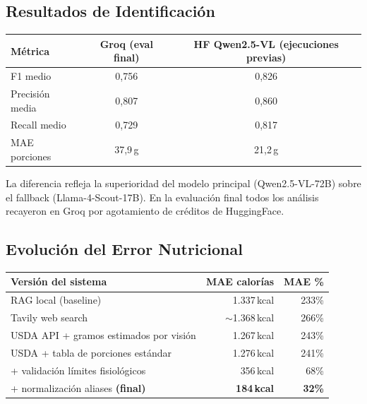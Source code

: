 \documentclass[10pt,a4paper]{article}
\begin{document}
\subsection{Resultados de Identificación}

\begin{center}
\begin{tabular}{lcc}
\toprule
\textbf{Métrica} & \textbf{Groq (eval final)} & \textbf{HF Qwen2.5-VL (ejecuciones previas)} \\
\midrule
F1 medio        & 0,756 & 0,826 \\
Precisión media & 0,807 & 0,860 \\
Recall medio    & 0,729 & 0,817 \\
MAE porciones   & 37,9\,g & 21,2\,g \\
\bottomrule
\end{tabular}
\end{center}

La diferencia refleja la superioridad del modelo principal (Qwen2.5-VL-72B) sobre el fallback
(Llama-4-Scout-17B). En la evaluación final todos los análisis recayeron en Groq por agotamiento
de créditos de HuggingFace.

\subsection{Evolución del Error Nutricional}

\begin{center}
\begin{tabular}{lrr}
\toprule
\textbf{Versión del sistema} & \textbf{MAE calorías} & \textbf{MAE \%} \\
\midrule
RAG local (baseline)                           & 1.337\,kcal & 233\% \\
Tavily web search                              & $\sim$1.368\,kcal & 266\% \\
USDA API + gramos estimados por visión         & 1.267\,kcal & 243\% \\
USDA + tabla de porciones estándar             & 1.276\,kcal & 241\% \\
\quad + validación límites fisiológicos        & 356\,kcal   &  68\% \\
\quad + normalización aliases \textbf{(final)} & \textbf{184\,kcal} & \textbf{32\%} \\
\bottomrule
\end{tabular}
\end{center}
\end{document}
